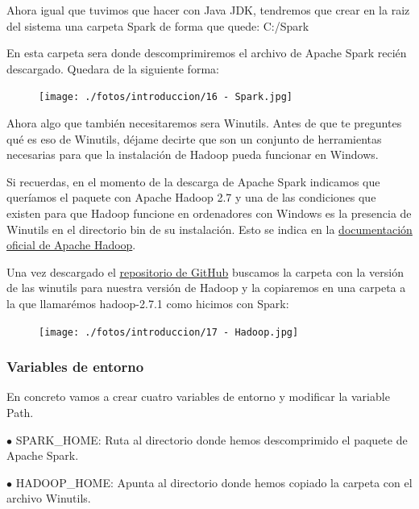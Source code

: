 \documentclass[a4paper,10pt]{article}
\begin{document}
Ahora igual que tuvimos que hacer con Java JDK, tendremos que crear en la raiz del sistema una carpeta Spark de forma que quede: C:/Spark 

En esta carpeta sera donde descomprimiremos el archivo de Apache Spark recién descargado. Quedara de la siguiente forma: 

\begin{figure}[H]
\begin{center}
\texttt{[image: ./fotos/introduccion/16 - Spark.jpg]}
\end{center}
\end{figure}

Ahora algo que también necesitaremos sera Winutils. Antes de que te preguntes qué es eso de Winutils, déjame decirte que son un conjunto de herramientas necesarias para que la instalación de Hadoop pueda funcionar en Windows. 

Si recuerdas, en el momento de la descarga de Apache Spark indicamos que queríamos el paquete con Apache Hadoop 2.7 y una de las condiciones que existen para que Hadoop funcione en ordenadores con Windows es la presencia de Winutils en el directorio bin de su instalación. Esto se indica en la \href{https://cwiki.apache.org/confluence/display/HADOOP2/WindowsProblems}{documentación oficial de Apache Hadoop}.

Una vez descargado el \href{https://github.com/steveloughran/winutils}{repositorio de GitHub} buscamos la carpeta con la versión de las winutils para nuestra versión de Hadoop  y la copiaremos en una carpeta a la que llamarémos hadoop-2.7.1 como hicimos con Spark:

\begin{figure}[H]
\begin{center}
\texttt{[image: ./fotos/introduccion/17 - Hadoop.jpg]}
\end{center}
\end{figure}

\subsubsection{Variables de entorno}

En concreto vamos a crear cuatro variables de entorno y modificar la variable Path.

$\bullet$ SPARK\_HOME: Ruta al directorio donde hemos descomprimido el paquete de Apache Spark. 

$\bullet$ HADOOP\_HOME: Apunta al directorio donde hemos copiado la carpeta con el archivo Winutils. 
\end{document}
